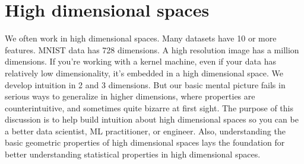 \documentclass{book}
\begin{document}
\section{High dimensional spaces}
We often work in high dimensional spaces. Many datasets have 10 or more features. MNIST data has 728 dimensions. A high resolution image has a million dimensions. If you're working with a kernel machine, even if your data has relatively low dimensionality, it's embedded in a high dimensional space. We develop intuition in 2 and 3 dimensions. But our basic mental picture fails in serious ways to generalize in higher dimensions, where properties are counterintuitive, and sometimes quite bizarre at first sight. The purpose of this discussion is to help build intuition about high dimensional spaces so you can be a better data scientist, ML practitioner, or engineer. Also, understanding the basic geometric properties of high dimensional spaces lays the foundation for better understanding statistical properties in high dimensional spaces. 
\end{document}
